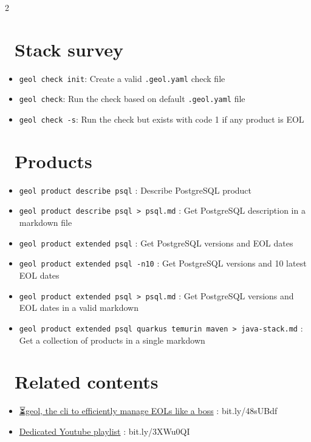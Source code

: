 \documentclass[a4paper,10pt]{article}
\newcommand{\cmd}[1]{\textcolor{geolgreen}{\texttt{#1}}}
\newenvironment{geolitemize}{%
  \begin{itemize}\setlength{\itemsep}{0.1em}\setlength{\parskip}{0pt}\setlength{\topsep}{0pt}
}{\end{itemize}}
\begin{document}
\begin{multicols}{2}
\section*{\faSearch\ Stack survey}
\begin{geolbox}
\begin{geolitemize}
  \item \cmd{geol check init}: Create a valid \cmd{.geol.yaml} check file
  \item \cmd{geol check}: Run the check based on default \cmd{.geol.yaml} file
  \item \cmd{geol check -s}: Run the check but exists with code 1 if any product is EOL
\end{geolitemize}
\end{geolbox}



\section*{\faBoxOpen\ Products}
\begin{geolbox}
\begin{geolitemize}
  \item \cmd{geol product describe psql} : Describe PostgreSQL product
  \item \cmd{geol product describe psql > psql.md} : Get PostgreSQL description in a markdown file
  \item \cmd{geol product extended psql} : Get PostgreSQL versions and EOL dates
  \item \cmd{geol product extended psql -n10} : Get PostgreSQL versions and 10 latest EOL dates
  \item \cmd{geol product extended psql > psql.md} : Get PostgreSQL versions and EOL dates in a valid markdown
  \item \cmd{geol product extended psql quarkus temurin maven > java-stack.md} : Get a collection of products in a single markdown
\end{geolitemize}
\end{geolbox}

\section*{\faBookmark\ Related contents}
\begin{geolbox}
\begin{minipage}[c]{0.7\linewidth}
\begin{geolitemize}
  \item \href{https://bit.ly/48sUBdf}{⏳geol, the cli to efficiently manage EOLs like a boss} : bit.ly/48sUBdf
  \item \href{https://bit.ly/3XWu0QI}{Dedicated Youtube playlist} : bit.ly/3XWu0QI
\end{geolitemize}
\end{minipage}%
\begin{minipage}[c]{0.3\linewidth}
\centering
{}
\end{minipage}
\end{geolbox}

\end{multicols}
\end{document}
